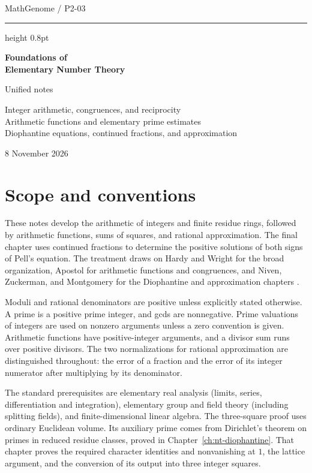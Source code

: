 \documentclass[11pt,oneside,openany]{book}
\theoremstyle{plain}
\theoremstyle{definition}
\theoremstyle{remark}
\begin{document}
\frontmatter
\hypersetup{pageanchor=false}
\begin{titlepage}
\thispagestyle{empty}
\vspace*{27mm}
{\large MathGenome \enspace / \enspace P2-03\par}
\vspace{8mm}
\hrule height 0.8pt
\vspace{11mm}
{\Huge\bfseries Foundations of\\[2mm] Elementary Number Theory\par}
\vspace{12mm}
{\large Unified notes\par}
\vspace{6mm}
{\normalsize Integer arithmetic, congruences, and reciprocity\\
Arithmetic functions and elementary prime estimates\\
Diophantine equations, continued fractions, and approximation\par}
\vfill
{\large 8 November 2026\par}
\end{titlepage}
\hypersetup{pageanchor=true}
\tableofcontents

\chapter*{Scope and conventions}
These notes develop the arithmetic of integers and finite residue rings,
followed by arithmetic functions, sums of squares, and rational
approximation. The final chapter uses continued fractions to determine
the positive solutions of both signs of Pell's equation. The treatment
draws on Hardy and Wright for the broad organization, Apostol for
arithmetic functions and congruences, and Niven, Zuckerman, and Montgomery
for the Diophantine and approximation chapters
\cite{hardy-wright,apostol,nzm}.

Moduli and rational denominators are positive unless explicitly stated
otherwise. A prime is a positive prime integer, and gcds are nonnegative.
Prime valuations of integers are used on nonzero arguments unless a
zero convention is given. Arithmetic functions have positive-integer
arguments, and a divisor sum runs over positive divisors. The two
normalizations for rational approximation are distinguished throughout:
the error of a fraction and the error of its integer numerator after
multiplying by its denominator.

The standard prerequisites are elementary real analysis (limits, series,
differentiation and integration), elementary group and field theory
(including splitting fields), and finite-dimensional linear algebra.
The three-square proof uses ordinary Euclidean volume. Its auxiliary
prime comes from Dirichlet's theorem on primes in reduced residue
classes, proved in Chapter~\ref{ch:nt-diophantine}. That chapter proves
the required character identities and nonvanishing at \(1\), the
lattice argument, and the conversion of its output into three
integer squares.
\end{document}
